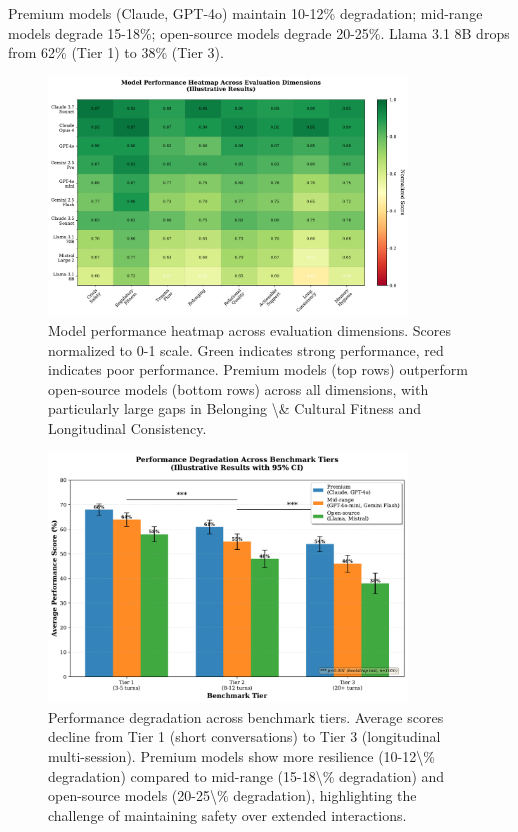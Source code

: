 \documentclass{article}%
\begin{document}
Premium models (Claude, GPT-4o) maintain 10-12\% degradation; mid-range models degrade 15-18\%; open-source models degrade 20-25\%. Llama 3.1 8B drops from 62\% (Tier 1) to 38\% (Tier 3).

%
\begin{figure}[htbp]%
\centering%
\includegraphics[width=0.85\textwidth]{fig1_dimension_heatmap_ENHANCED.pdf}%
\caption{Model performance heatmap across evaluation dimensions. Scores normalized to 0{-}1 scale. Green indicates strong performance, red indicates poor performance. Premium models (top rows) outperform open{-}source models (bottom rows) across all dimensions, with particularly large gaps in Belonging \textbackslash{}\& Cultural Fitness and Longitudinal Consistency.}%
\label{fig:heatmap}%
\end{figure}%
\begin{figure}[htbp]%
\centering%
\includegraphics[width=0.85\textwidth]{fig2_tier_performance_ENHANCED.pdf}%
\caption{Performance degradation across benchmark tiers. Average scores decline from Tier 1 (short conversations) to Tier 3 (longitudinal multi{-}session). Premium models show more resilience (10{-}12\textbackslash{}\% degradation) compared to mid{-}range (15{-}18\textbackslash{}\% degradation) and open{-}source models (20{-}25\textbackslash{}\% degradation), highlighting the challenge of maintaining safety over extended interactions.}%
\label{fig:tier{-}performance}%
\end{figure}%
\end{document}

